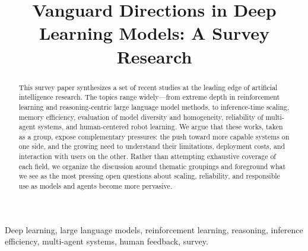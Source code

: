 \documentclass[conference]{IEEEtran}
\newcommand{\PaperTitle}{Vanguard Directions in Deep Learning Models: A Survey Research}
\begin{document}
\title{\PaperTitle\\
}

\author{
\and
{}
\and
{}
\and
{}
}

\maketitle

\begin{abstract}
This survey paper synthesizes a set of recent studies at the leading edge of artificial intelligence research. The topics range widely---from extreme depth in reinforcement learning and reasoning-centric large language model methods, to inference-time scaling, memory efficiency, evaluation of model diversity and homogeneity, reliability of multi-agent systems, and human-centered robot learning. We argue that these works, taken as a group, expose complementary pressures: the push toward more capable systems on one side, and the growing need to understand their limitations, deployment costs, and interaction with users on the other. Rather than attempting exhaustive coverage of each field, we organize the discussion around thematic groupings and foreground what we see as the most pressing open questions about scaling, reliability, and responsible use as models and agents become more pervasive.
\end{abstract}

\begin{IEEEkeywords}
Deep learning, large language models, reinforcement learning, reasoning, inference efficiency, multi-agent systems, human feedback, survey.
\end{IEEEkeywords}
\end{document}
